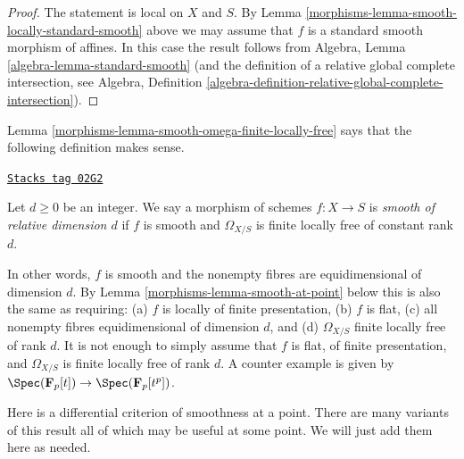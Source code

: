 \begin{proof}

The statement is local on $X$ and $S$.
By Lemma \ref{morphisms-lemma-smooth-locally-standard-smooth}
above we may assume that $f$ is a standard smooth morphism of affines.
In this case the result follows from
Algebra, Lemma \ref{algebra-lemma-standard-smooth}
(and the definition of a relative global complete intersection, see
Algebra,
Definition \ref{algebra-definition-relative-global-complete-intersection}).
\end{proof}

Lemma \ref{morphisms-lemma-smooth-omega-finite-locally-free}
says that the following definition makes sense.

\begin{definition}
\label{morphisms-definition-smooth-relative-dimension}
\href{https://stacks.math.columbia.edu/tag/02G2}{\texttt{Stacks tag 02G2}}

Let $d \geq 0$ be an integer. We say a morphism of schemes $f : X \to S$
is {\it smooth of relative dimension $d$} if $f$ is smooth and
$\Omega_{X/S}$ is finite locally free of constant rank $d$.
\end{definition}

In other words, $f$ is smooth and the nonempty fibres are equidimensional
of dimension $d$. By Lemma \ref{morphisms-lemma-smooth-at-point} below this is also
the same as requiring: (a) $f$ is locally of finite presentation, (b) $f$ is
flat, (c) all nonempty fibres equidimensional of dimension $d$, and (d)
$\Omega_{X/S}$ finite locally free of rank $d$. It is not enough to simply
assume that $f$ is flat, of finite presentation, and $\Omega_{X/S}$ is
finite locally free of rank $d$. A counter example is given by
$\Spec(\mathbf{F}_p[t]) \to \Spec(\mathbf{F}_p[t^p])$.

\medskip\noindent
Here is a differential criterion of smoothness at a point.
There are many variants of this result
all of which may be useful at some point. We will just add them
here as needed.

